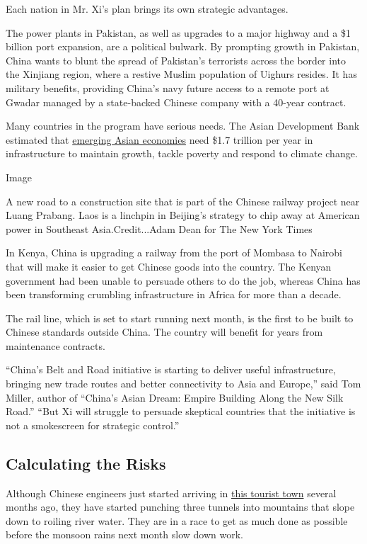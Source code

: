 Each nation in Mr. Xi's plan brings its own strategic advantages.

The power plants in Pakistan, as well as upgrades to a major highway and
a \$1 billion port expansion, are a political bulwark. By prompting
growth in Pakistan, China wants to blunt the spread of Pakistan's
terrorists across the border into the Xinjiang region, where a restive
Muslim population of Uighurs resides. It has military benefits,
providing China's navy future access to a remote port at Gwadar managed
by a state-backed Chinese company with a 40-year contract.

Many countries in the program have serious needs. The Asian Development
Bank estimated that
\href{https://www.adb.org/publications/asia-infrastructure-needs}{emerging
Asian economies} need \$1.7 trillion per year in infrastructure to
maintain growth, tackle poverty and respond to climate change.

Image

A new road to a construction site that is part of the Chinese railway
project near Luang Prabang. Laos is a linchpin in Beijing's strategy to
chip away at American power in Southeast Asia.Credit...Adam Dean for The
New York Times

In Kenya, China is upgrading a railway from the port of Mombasa to
Nairobi that will make it easier to get Chinese goods into the country.
The Kenyan government had been unable to persuade others to do the job,
whereas China has been transforming crumbling infrastructure in Africa
for more than a decade.

The rail line, which is set to start running next month, is the first to
be built to Chinese standards outside China. The country will benefit
for years from maintenance contracts.

``China's Belt and Road initiative is starting to deliver useful
infrastructure, bringing new trade routes and better connectivity to
Asia and Europe,'' said Tom Miller, author of ``China's Asian Dream:
Empire Building Along the New Silk Road.'' ``But Xi will struggle to
persuade skeptical countries that the initiative is not a smokescreen
for strategic control.''

\hypertarget{calculating-the-risks}{%
\subsection{Calculating the Risks}\label{calculating-the-risks}}

Although Chinese engineers just started arriving in
\href{https://www.nytimes3xbfgragh.onion/2016/10/02/travel/vang-vieng-laos-river-tubing-haven-offers-more-peace.html}{this
tourist town} several months ago, they have started punching three
tunnels into mountains that slope down to roiling river water. They are
in a race to get as much done as possible before the monsoon rains next
month slow down work.

